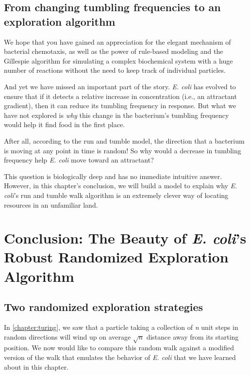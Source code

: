 \subsection{From changing tumbling frequencies to an exploration algorithm}

We hope that you have gained an appreciation for the elegant mechanism of bacterial chemotaxis, as well as the power of rule-based modeling and the Gillespie algorithm for simulating a complex biochemical system with a huge number of reactions without the need to keep track of individual particles.

And yet we have missed an important part of the story. \textit{E. coli} has evolved to ensure that if it detects a relative increase in concentration (i.e., an attractant gradient), then it can reduce its tumbling frequency in response. But what we have not explored is \textit{why} this change in the bacterium's tumbling frequency would help it find food in the first place.

After all, according to the run and tumble model, the direction that a bacterium is moving at any point in time is random! So why would a decrease in tumbling frequency help \textit{E. coli} move toward an attractant?

This question is biologically deep and has no immediate intuitive answer. However, in this chapter's conclusion, we will build a model to explain why \textit{E. coli}'s run and tumble walk algorithm is an extremely clever way of locating resources in an unfamiliar land.\\


\FloatBarrier
{}

\section{Conclusion: The Beauty of \textit{E. coli}'s Robust Randomized Exploration Algorithm}
\label{sec:conclusion}

\subsection{Two randomized exploration strategies}

In \autoref{chapter:turing}, we saw that a particle taking a collection of \textit{n} unit steps in random directions will wind up on average $\sqrt{n}$ distance away from its starting position. We now would like to compare this random walk against a modified version of the walk that emulates the behavior of \textit{E. coli} that we have learned about in this chapter.

